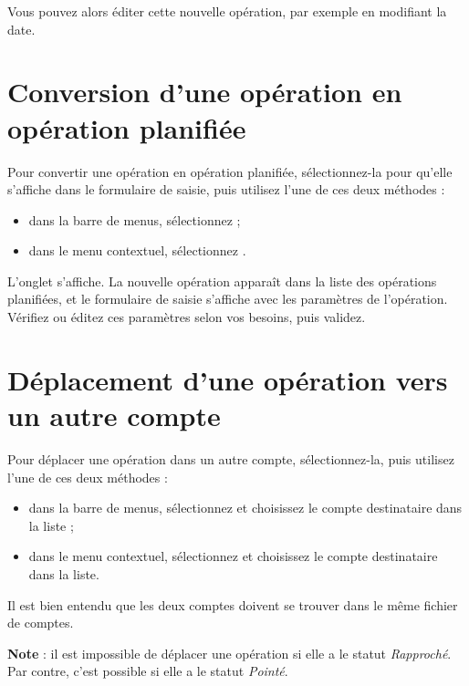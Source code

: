 Vous pouvez alors éditer cette nouvelle opération, par exemple en modifiant la date.


\section{Conversion d'une opération en opération planifiée\label{transactions-schedule}}


Pour convertir une opération en opération planifiée, sélectionnez-la pour qu'elle s'affiche dans le formulaire de saisie, puis utilisez l'une de ces deux méthodes :
\begin{itemize}
	 \item dans la barre de menus, sélectionnez  ;
	 \item dans le menu contextuel, sélectionnez .
\end{itemize}

L'onglet  s'affiche. La nouvelle opération apparaît dans la liste des opérations planifiées, et le formulaire de saisie s'affiche avec les paramètres de l'opération. Vérifiez ou éditez ces paramètres selon vos besoins, puis validez.


\section{Déplacement d'une opération vers un autre compte\label{transactions-move}}


Pour déplacer une opération dans un autre compte, sélectionnez-la, puis utilisez l'une de ces deux méthodes :

\begin{itemize}
	 \item dans la barre de menus, sélectionnez  et choisissez le compte destinataire dans la liste ;
	 \item dans le menu contextuel, sélectionnez  et choisissez le compte destinataire dans la liste.
\end{itemize}

Il est bien entendu que les deux comptes doivent se trouver dans le même fichier de comptes.

\textbf{Note} : il est impossible de déplacer une opération si elle a le statut \emph{Rapproché}. Par contre, c'est possible si elle a le statut \emph{Pointé}.


